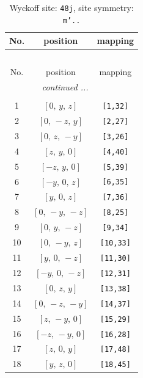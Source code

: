 \documentclass[fleqn,8pt]{jsarticle}
\begin{document}
\begin{longtable}{ccc}
\caption{Wyckoff site: {\tt 48j}, site symmetry: {\tt m'..}}
 \\
 \hline \hline
No. & position & mapping \\ \hline \endfirsthead

\multicolumn{2}{l}{\tablename\ \thetable{}} \\
 \hline \hline
No. & position & mapping \\ \hline \endhead

 \hline \hline
\multicolumn{2}{r}{\footnotesize\it continued ...} \\ \endfoot

 \hline \hline
\multicolumn{2}{r}{} \\ \endlastfoot

1 & $\left[ 0,\, y,\, z \right]$ & {\tt [1,32]} \\ \hline
2 & $\left[ 0,\, - z,\, y \right]$ & {\tt [2,27]} \\ \hline
3 & $\left[ 0,\, z,\, - y \right]$ & {\tt [3,26]} \\ \hline
4 & $\left[ z,\, y,\, 0 \right]$ & {\tt [4,40]} \\ \hline
5 & $\left[ - z,\, y,\, 0 \right]$ & {\tt [5,39]} \\ \hline
6 & $\left[ - y,\, 0,\, z \right]$ & {\tt [6,35]} \\ \hline
7 & $\left[ y,\, 0,\, z \right]$ & {\tt [7,36]} \\ \hline
8 & $\left[ 0,\, - y,\, - z \right]$ & {\tt [8,25]} \\ \hline
9 & $\left[ 0,\, y,\, - z \right]$ & {\tt [9,34]} \\ \hline
10 & $\left[ 0,\, - y,\, z \right]$ & {\tt [10,33]} \\ \hline
11 & $\left[ y,\, 0,\, - z \right]$ & {\tt [11,30]} \\ \hline
12 & $\left[ - y,\, 0,\, - z \right]$ & {\tt [12,31]} \\ \hline
13 & $\left[ 0,\, z,\, y \right]$ & {\tt [13,38]} \\ \hline
14 & $\left[ 0,\, - z,\, - y \right]$ & {\tt [14,37]} \\ \hline
15 & $\left[ z,\, - y,\, 0 \right]$ & {\tt [15,29]} \\ \hline
16 & $\left[ - z,\, - y,\, 0 \right]$ & {\tt [16,28]} \\ \hline
17 & $\left[ z,\, 0,\, y \right]$ & {\tt [17,48]} \\ \hline
18 & $\left[ y,\, z,\, 0 \right]$ & {\tt [18,45]} \\ \hline

\end{longtable}
\end{document}
